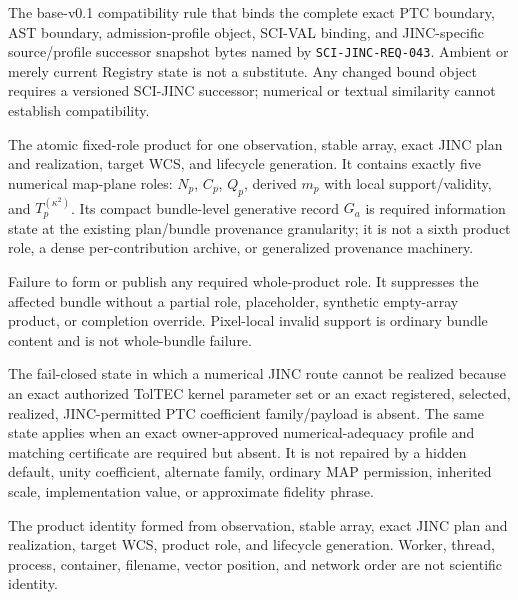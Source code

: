 \begin{description}[style=nextline,leftmargin=0pt,labelindent=0pt]
\item[Exact-source lock.]
The base-v0.1 compatibility rule that binds the complete exact PTC boundary,
AST boundary, admission-profile object, SCI-VAL binding, and JINC-specific
source/profile successor snapshot bytes named by
\texttt{SCI-JINC-REQ-043}.  Ambient or merely current Registry state is not a
substitute.  Any changed bound object requires a versioned SCI-JINC
successor; numerical or textual similarity cannot establish compatibility.

\item[Complete observation bundle.]
The atomic fixed-role product for one observation, stable array, exact JINC
plan and realization, target WCS, and lifecycle generation.  It contains
exactly five numerical map-plane roles: $N_p$, $C_p$, $Q_p$, derived $m_p$
with local support/validity, and $T_p^{(\kappa^2)}$.  Its compact bundle-level
generative record $G_a$ is required information state at the existing
plan/bundle provenance granularity; it is not a sixth product role, a dense
per-contribution archive, or generalized provenance machinery.

\item[Whole-bundle failure.]
Failure to form or publish any required whole-product role.  It suppresses the
affected bundle without a partial role, placeholder, synthetic empty-array
product, or completion override.  Pixel-local invalid support is ordinary
bundle content and is not whole-bundle failure.

\item[Typed numerical unavailability.]
The fail-closed state in which a numerical JINC route cannot be realized
because an exact authorized TolTEC kernel parameter set or an exact registered,
selected, realized, JINC-permitted PTC coefficient family/payload is absent.
The same state applies when an exact owner-approved numerical-adequacy profile
and matching certificate are required but absent.  It is not repaired by a
hidden default, unity coefficient, alternate family, ordinary MAP permission,
inherited scale, implementation value, or approximate fidelity phrase.

\item[Scientific destination identity.]
The product identity formed from observation, stable array, exact JINC plan and
realization, target WCS, product role, and lifecycle generation.  Worker,
thread, process, container, filename, vector position, and network order are
not scientific identity.
\end{description}
